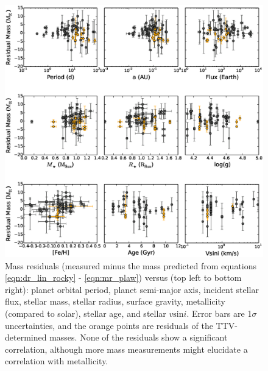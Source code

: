 \documentclass[iop]{emulateapj}
\begin{document}
\begin{figure}[htbp] %
   \centering
    \includegraphics[width=7in]{mr_resids.eps} 
   \caption{\small Mass residuals (measured minus the mass predicted from equations \ref{eqn:dr_lin_rocky} - \ref{eqn:mr_plaw}) versus (top left to bottom right): planet orbital period, planet semi-major axis, incident stellar flux, stellar mass, stellar radius, surface gravity, metallicity (compared to solar), stellar age, and stellar $v\mathrm{sin}i$. Error bars are 1$\sigma$ uncertainties, and the orange points are residuals of the TTV-determined masses.  None of the residuals show a significant correlation, although more mass measurements might elucidate a correlation with metallicity.}
   \label{fig:resids}
\end{figure}

\clearpage
\end{document}
